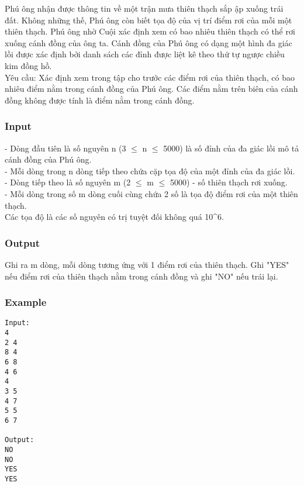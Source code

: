 



   Phú ông nhận được thông tin về một trận mưa thiên thạch sắp ập xuống trái đất. Không những thế, Phú ông còn biết tọa độ của vị trí điểm rơi của mỗi một thiên thạch. Phú ông nhờ Cuội xác định xem có bao nhiêu thiên thạch có thể rơi xuống cánh đồng của ông ta. Cánh đồng của Phú ông có dạng một hình đa giác lồi được xác định bởi danh sách các đỉnh được liệt kê theo thứ tự ngược chiều kim đồng hồ.   
\\       Yêu cầu:      Xác định xem trong tập cho trước các điểm rơi của thiên thạch, có bao nhiêu điểm nằm trong cánh đồng của Phú ông. Các điểm nằm trên biên của cánh đồng không được tính là điểm nằm trong cánh đồng.  

\subsubsection{   Input  }

   - Dòng đầu tiên là số nguyên n (3  $\le$  n  $\le$  5000) là số đỉnh của đa giác lồi mô tả cánh đồng của Phú ông.   
\\   - Mỗi dòng trong n dòng tiếp theo chứa cặp tọa độ của một đỉnh của đa giác lồi.   
\\   - Dòng tiếp theo là số nguyên m (2  $\le$  m  $\le$  5000) - số thiên thạch rơi xuống.   
\\   - Mỗi dòng trong số m dòng cuối cùng chứa 2 số là tọa độ điểm rơi của một thiên thạch.   
\\   Các tọa độ là các số nguyên có trị tuyệt đối không quá 10^6.  

\subsubsection{   Output  }

   Ghi ra m dòng, mỗi dòng tương ứng với 1 điểm rơi của thiên thạch. Ghi "YES" nếu điểm rơi của thiên thạch nằm trong cánh đồng và ghi "NO" nếu trái lại.  

\subsubsection{   Example  }
\begin{verbatim}
Input:
4
2 4
8 4
6 8
4 6
4
3 5
4 7
5 5
6 7

Output:
NO
NO
YES
YES
\end{verbatim}
